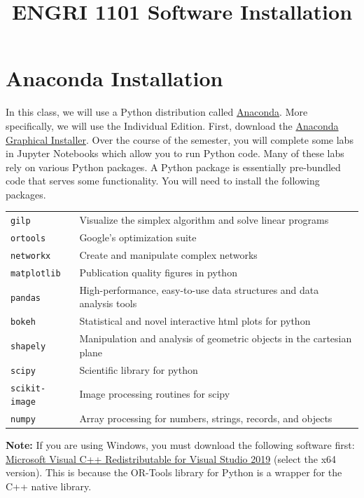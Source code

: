 \documentclass[11 pt]{article}
\title{ENGRI 1101 Software Installation}
\date{}
\begin{document}
\maketitle

\section{Anaconda Installation}

In this class, we will use a Python distribution called \href{https://www.anaconda.com/}{Anaconda}. More specifically, we will use the Individual Edition. First, download the \href{https://www.anaconda.com/products/individual}{Anaconda Graphical Installer}. Over the course of the semester, you will complete some labs in Jupyter Notebooks which allow you to run Python code. Many of these labs rely on various Python packages. A Python package is essentially pre-bundled code that serves some functionality. You will need to install the following packages. 

\begin{center}
\begin{tabular}{ll}
 \texttt{gilp} & Visualize the simplex algorithm and solve linear programs \\
 \texttt{ortools} & Google's optimization suite \\
 \texttt{networkx} &  Create and manipulate complex networks \\
 \texttt{matplotlib} & Publication quality figures in python \\
 \texttt{pandas} & High-performance, easy-to-use data structures and data analysis tools \\
 \texttt{bokeh} & Statistical and novel interactive html plots for python \\
 \texttt{shapely} & Manipulation and analysis of geometric objects in the cartesian plane \\
 \texttt{scipy} & Scientific library for python \\
 \texttt{scikit-image} & Image processing routines for scipy \\
 \texttt{numpy} & Array processing for numbers, strings, records, and objects \\
\end{tabular}
\end{center}

\noindent \textbf{Note:} If you are using Windows, you must download the following software first: \href{https://visualstudio.microsoft.com/downloads/?q=Visual+C\%2B\%2B+Redistributable+for+Visual+Studio}{Microsoft Visual C++ Redistributable for Visual Studio 2019} (select the x64 version). This is because the OR-Tools library for Python is a wrapper for the C++ native library. \newline
\end{document}
